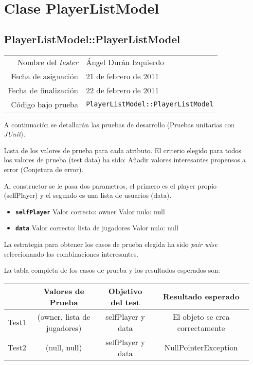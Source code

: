 \section{Clase PlayerListModel}

\subsection{PlayerListModel::PlayerListModel}

{\small
\begin{tabular}{r|l}
Nombre del \textit{tester} & \'Angel Dur\'an Izquierdo\\
Fecha de asignación & 21 de febrero de 2011 \\
Fecha de finalización & 22 de febrero de 2011 \\
Código bajo prueba & \texttt{PlayerListModel::PlayerListModel}
\end{tabular}
}

A continuación se detallarán las pruebas de desarrollo (Pruebas unitarias con \textit{JUnit}).

Lista de los valores de prueba para cada atributo.
El criterio elegido para todos los valores de prueba (test data) ha sido: Añadir valores interesantes propensos a error (Conjetura de error).

Al constructor se le pasa dos parametros, el primero es el player propio (selfPlayer) y el segundo es una lista de usuarios (data).

\begin{itemize}
\item \textbf{\texttt{selfPlayer}}
\subitem Valor correcto: owner
\subitem Valor nulo: null
\end{itemize}

\begin{itemize}
\item \textbf{\texttt{data}}
\subitem Valor correcto: lista de jugadores
\subitem Valor nulo: null
\end{itemize}

La estrategia para obtener los casos de prueba elegida ha sido
\textit{pair wise} seleccionando las combinaciones interesantes.

La tabla completa de los casos de prueba y los resultados esperados son:

{\footnotesize
\begin{longtable}[c]{lccc}
 & \textbf{Valores de Prueba} & \textbf{Objetivo del test} & \textbf{Resultado esperado} \\
\hline \hline
\endhead

Test1 & (owner, lista de jugadores) & selfPlayer y data & El objeto se crea correctamente\\
Test2 & (null, null) & selfPlayer y data & NullPointerException\\

\hline
\end{longtable}
}

